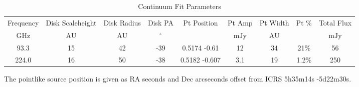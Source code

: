 \begin{table*}[htp]
\centering
\caption{Continuum Fit Parameters}
\begin{tabular}{ccccccccc}
\label{tab:continuum_fit_parameters}
Frequency & Disk Scaleheight & Disk Radius & Disk PA & Pt Position & Pt Amp & Pt Width & Pt \% & Total Flux \\
$\mathrm{GHz}$ & $\mathrm{AU}$ & $\mathrm{AU}$ & $\mathrm{{}^{\circ}}$ &  & $\mathrm{mJy}$ & $\mathrm{AU}$ & $\mathrm{}$ & $\mathrm{mJy}$ \\
\hline
93.3 & 15 & 42 & -39 & 0.5174 -0.61 & 12 & 34 & 21\% & 56 \\
224.0 & 16 & 50 & -38 & 0.5182 -0.607 & 3.1 & 19 & 1.2\% & 250 \\
\hline
\end{tabular}

\par The pointlike source position is given as RA seconds and Dec arcseconds offset from ICRS 5h35m14s -5d22m30s.
\end{table*}
